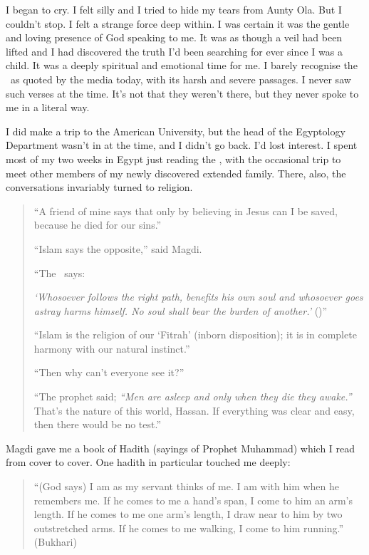 \documentclass[12pt]{memoir}
\begin{document}
I began to cry.
I felt silly and I tried to hide my tears from Aunty Ola.
But I couldn’t stop.
I felt a strange force deep within.
I was certain it was the gentle and loving presence of God speaking to me.
It was as though a veil had been lifted and I had discovered the truth
I’d been searching for ever since I was a child.
It was a deeply spiritual and emotional time for me.
I  barely recognise the \Quran\ as quoted by the media today,
with its harsh and severe passages.
I never saw such verses at the time.
It’s not that they weren’t there,
but they never spoke to me in a literal way.

I did make a trip to the American University,
but the head of the Egyptology Department wasn’t in at the time,
and I didn’t go back.
I’d lost interest.
I spent most of my two weeks in Egypt just reading the \Quran,
with the occasional trip to meet other members
of my newly discovered extended family.
There, also, the conversations invariably turned to religion.

\begin{quote}
“A friend of mine says that only by believing in Jesus can I be saved,
because he died for our sins.”

“Islam says the opposite,” said Magdi.

“The \Quran\ says:

\emph{‘Whosoever follows the right path, benefits his own soul
and whosoever goes astray harms himself.
No soul shall bear the burden of another.’}
()”

“Islam is the religion of our ‘Fitrah’ (inborn disposition);
it is in complete harmony with our natural instinct.”

“Then why can’t everyone see it?”

“The prophet said;
\emph{“Men are asleep and only when they die they awake.”}
That’s the nature of this world, Hassan.
If everything was clear and easy, then there would be no test.”
\end{quote}

Magdi gave me a book of Hadith (sayings of Prophet Muhammad)
which I read from cover to cover.
One hadith in particular touched me deeply:

\begin{quote}
“(God says) I am as my servant thinks of me.
I am with him when he remembers me.
If he comes to me a hand’s span, I come to him an arm’s length.
If he comes to me one arm’s length,
I draw near to him by two outstretched arms.
If he comes to me walking, I come to him running.” (Bukhari)
\end{quote}
\end{document}
